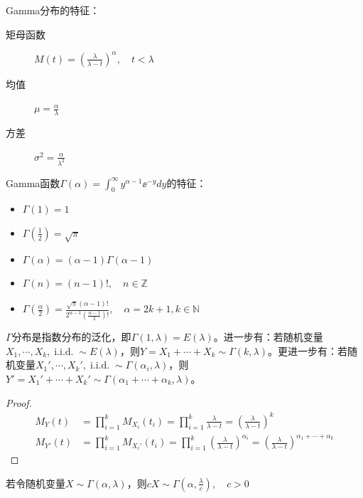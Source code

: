 Gamma分布的特征：
\begin{description}
    \item[矩母函数] $M(t)=(\frac{\lambda}{\lambda-t})^{\alpha} , \quad t<\lambda$
    \item[均值] $\mu=\frac{\alpha}{\lambda}$
    \item[方差] $\sigma^2=\frac{\alpha}{\lambda^{2}}$
\end{description}

Gamma函数$\Gamma(\alpha)=\int_0^{\infty}y^{\alpha-1}\ee^{-y}dy$的特征：
\begin{itemize}
    \item $\Gamma(1)=1$
    \item $\Gamma(\frac{1}{2})=\sqrt{\pi}$
    \item $\Gamma(\alpha)=(\alpha-1)\Gamma(\alpha-1)$
    \item $\Gamma(n)=(n-1)!,\quad n \in \mathbb{Z}$
    \item $\Gamma(\frac{\alpha}{2})=\frac{\sqrt{\pi}(\alpha-1)!}{2^{\alpha-1}(\frac{\alpha-1}{2})!}, \quad \alpha=2k+1,k \in \mathbb{N}$
\end{itemize}

\begin{proposition}\label{prop:sum_of_Gamma}
    $\Gamma$分布是指数分布的泛化，即$\Gamma(1,\lambda)=E(\lambda)$。进一步有：若随机变量$X_1,\cdots ,X_k, \operatorname{i.i.d.} \sim E(\lambda)$，则$Y=X_1+\cdots+X_k  \sim \Gamma(k,\lambda)$。更进一步有：若随机变量$X_1',\cdots ,X_k', \operatorname{i.i.d.} \sim \Gamma(\alpha_i,\lambda)$，则$Y'=X_1'+\cdots+X_k'  \sim \Gamma(\alpha_1+\cdots +\alpha_k,\lambda)$。
\end{proposition}

\begin{proof}
    \begin{align*}
        M_Y(t)    & =\prod_{i=1}^k M_{X_i}(t_i)=\prod_{i=1}^k \frac{\lambda}{\lambda-t}=(\frac{\lambda}{\lambda-t})^{k}                                       \\
        M_{Y'}(t) & =\prod_{i=1}^k M_{X_i'}(t_i)=\prod_{i=1}^k (\frac{\lambda}{\lambda-t})^{\alpha_i}=(\frac{\lambda}{\lambda-t})^{\alpha_1+\cdots +\alpha_k}
    \end{align*}
\end{proof}

\begin{proposition}
    若令随机变量$X \sim \Gamma(\alpha,\lambda)$，则$cX \sim \Gamma(\alpha,\frac{\lambda}{c}), \quad c>0$
\end{proposition}

